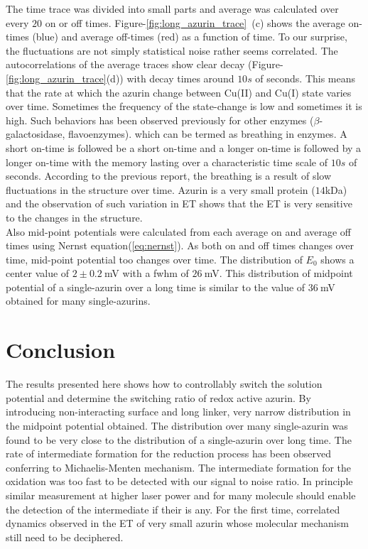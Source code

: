 \documentclass[journal=jacsat,manuscript=article]{achemso}
\begin{document}
The time trace was divided into small parts and average was calculated over every $20$ on or off times. Figure-\ref{fig:long_azurin_trace}~(c) shows the average on-times (blue) and average off-times (red) as a function of time. To our surprise, the fluctuations are not simply statistical noise rather seems correlated. The autocorrelations of the average traces show clear decay (Figure-\ref{fig:long_azurin_trace}(d)) with decay times around $10s$ of seconds. This means that the rate at which the azurin change between Cu(II) and Cu(I) state varies over time. Sometimes the frequency of the state-change is low and sometimes it is high. Such behaviors has been observed previously for other enzymes ($\beta$-galactosidase, flavoenzymes).\cite{lu1998single-molecule,kou2005single-molecule,english2006ever-fluctuating} which can be termed as breathing in enzymes. A short on-time is followed be a short on-time and a longer on-time is followed by a longer on-time with the memory lasting over a characteristic time scale of $10s$ of seconds. According to the previous report, the breathing is a result of slow fluctuations in the structure over time. Azurin is a very small protein ($14$kDa) and the observation of such variation in ET shows that the ET is very sensitive to the changes in the structure.\\

Also mid-point potentials were calculated from each average on and average off times using Nernst equation(\ref{eq:nernst}). As both on and off times changes over time, mid-point potential too changes over time. The distribution of $E_0$ shows a center value of $2\pm0.2~$mV with a fwhm of $26~$mV. This distribution of midpoint potential of a single-azurin over a long time is similar to the value of $36~$mV obtained for many single-azurins.
\section{Conclusion}
The results presented here shows how to controllably switch the solution potential and determine the switching ratio of redox active azurin. By introducing non-interacting surface and long linker, very narrow distribution in the midpoint potential obtained. The distribution over many single-azurin was found to be very close to the distribution of a single-azurin over long time. The rate of intermediate formation for the reduction process has been observed conferring to Michaelis-Menten mechanism. The intermediate formation for the oxidation was too fast to be detected with our signal to noise ratio. In principle similar measurement at higher laser power and for many molecule should enable the detection of the intermediate if their is any. For the first time, correlated dynamics observed in the ET of very small azurin whose molecular mechanism still need to be deciphered.
% 
\pagebreak

\end{document}
